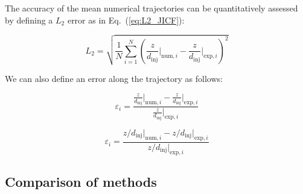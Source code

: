 The accuracy of the mean numerical trajectories can be quantitatively assessed by defining a $L_2$ error as in Eq.~(\ref{eq:L2_JICF}): 

\begin{equation}
\label{eq:L2_JICF}
    L_2 = \sqrt{\frac{1}{N}   \sum_{i=1}^N \left( \frac{z}{d_\mathrm{inj}} \Bigr|_{\mathrm{num},i} -   \frac{z}{d_\mathrm{inj}} \Bigr|_{\mathrm{exp},i} \right)^2}
\end{equation}



We can also define an error along the trajectory as follows:



\begin{equation}
\varepsilon_i  =  \frac{ \frac{z}{d_\mathrm{inj}} \Bigr|_{\mathrm{num},i} - \frac{z}{d_\mathrm{inj}} \Bigr|_{\mathrm{exp},i} }{ \frac{z}{d_\mathrm{inj}} \Bigr|_{\mathrm{exp},i} }
\end{equation}

\begin{equation}
\varepsilon_i  =  \frac{ z/d_\mathrm{inj} \Bigr|_{\mathrm{num},i} - z/d_\mathrm{inj} \Bigr|_{\mathrm{exp},i} }{ z/d_\mathrm{inj} \Bigr|_{\mathrm{exp},i} }
\end{equation}


\subsection{Comparison of methods}


